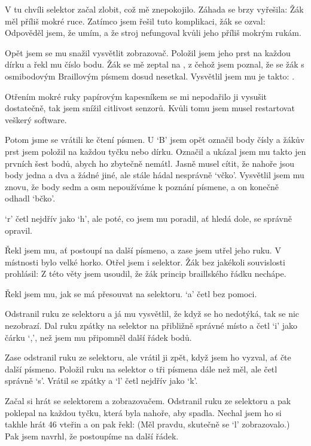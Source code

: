 V tu chvíli selektor začal zlobit, což mě znepokojilo. Záhada se brzy vyřešila: Žák měl příliš mokré ruce. Zatímco jsem řešil tuto komplikaci, žák se ozval:   Odpověděl jsem, že umím, a že stroj nefungoval kvůli jeho příliš mokrým rukám.

Opět jsem se mu snažil vysvětlit zobrazovač.  Položil jsem jeho prst na každou dírku a řekl mu číslo bodu.  Žák se mě zeptal na , z čehož jsem poznal, že se žák s osmibodovým Braillovým písmem dosud nesetkal.  Vysvětlil jsem mu je takto: .

Otřením mokré ruky papírovým kapesníkem se mi nepodařilo ji vysušit dostatečně, tak jsem snížil citlivost senzorů.  Kvůli tomu jsem musel restartovat veškerý software.

Potom jsme se vrátili ke čtení písmen.  U `B' jsem opět označil body čísly a žákův prst jsem položil na každou tyčku nebo dírku. Označil a ukázal jsem mu takto jen prvních šest bodů, abych ho zbytečně nemátl.  Jasně musel cítit, že nahoře jsou body jedna a dva a žádné jiné, ale stále hádal nesprávně `včko'.  Vysvětlil jsem mu znovu, že body sedm a osm nepoužíváme k poznání písmene, a on konečně odhadl `bčko'.

`r' četl nejdřív jako `h', ale poté, co jsem mu poradil, ať hledá dole, se správně opravil.

Řekl jsem mu, ať postoupí na další písmeno, a zase jsem utřel jeho ruku.  V místnosti bylo velké horko.  Otřel jsem i selektor. Žák bez jakékoli souvislosti prohlásil:  Z této věty jsem usoudil, že žák princip braillského řádku nechápe.

Řekl jsem mu, jak se má přesouvat na selektoru. `a' četl bez pomoci.

Odstranil ruku ze selektoru a já mu vysvětlil, že když se ho nedotýká, tak se nic nezobrazí.  Dal ruku zpátky na selektor na přibližně správné místo a četl `i' jako čárku `,', než jsem mu připomněl další řádek bodů.

Zase odstranil ruku ze selektoru, ale vrátil ji zpět, když jsem ho vyzval, ať čte další písmeno. Položil ruku na selektor o tři písmena dále než měl, ale četl správně `s'. Vrátil se zpátky a `l' četl nejdřív jako `k'.

Začal si hrát se selektorem a zobrazovačem.  Odstranil ruku ze selektoru a pak poklepal na každou tyčku, která byla nahoře, aby spadla.  Nechal jsem ho si takhle hrát 46 vteřin a on pak řekl:  (Měl pravdu, skutečně se `l' zobrazovalo.)  Pak jsem navrhl, že postoupíme na další řádek.

